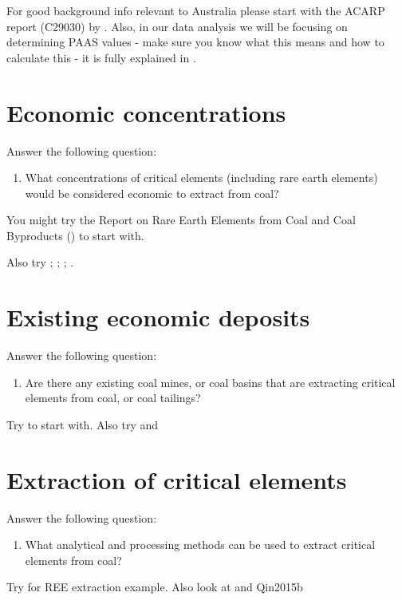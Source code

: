 \documentclass[preprint, 3p,
authoryear]{elsarticle} %
\providecommand{\tightlist}{%
  \setlength{\itemsep}{0pt}\setlength{\parskip}{0pt}}
\begin{document}
For good background info relevant to Australia please start with the
ACARP report (C29030) by \citet{Hodgkinson2021}. Also, in our data
analysis we will be focusing on determining PAAS values - make sure you
know what this means and how to calculate this - it is fully explained
in \citet{Hodgkinson2021}.

\hypertarget{economic-concentrations}{%
\section{Economic concentrations}\label{economic-concentrations}}

Answer the following question:

\begin{enumerate}
\def\labelenumi{\arabic{enumi}.}
\setcounter{enumi}{2}
\tightlist
\item
  What concentrations of critical elements (including rare earth
  elements) would be considered economic to extract from coal?
\end{enumerate}

You might try the Report on Rare Earth Elements from Coal and Coal
Byproducts (\citet{usde2017}) to start with.

Also try \citet{Seredin2012}; \citet{Dai2016}; \citet{Qin2015b};
\citet{SUN2014}.

\citet{Eterigho2021}

\hypertarget{existing-economic-deposits}{%
\section{Existing economic deposits}\label{existing-economic-deposits}}

Answer the following question:

\begin{enumerate}
\def\labelenumi{\arabic{enumi}.}
\setcounter{enumi}{3}
\tightlist
\item
  Are there any existing coal mines, or coal basins that are extracting
  critical elements from coal, or coal tailings?
\end{enumerate}

Try \citet{Qin2015b} to start with. Also try \citet{Sun2010} and
\citet{Qin2015}

\hypertarget{extraction-of-critical-elements}{%
\section{Extraction of critical
elements}\label{extraction-of-critical-elements}}

Answer the following question:

\begin{enumerate}
\def\labelenumi{\arabic{enumi}.}
\setcounter{enumi}{4}
\tightlist
\item
  What analytical and processing methods can be used to extract critical
  elements from coal?
\end{enumerate}

Try \citet{Eterigho2021} for REE extraction example. Also look at
\citet{Qin2015} and Qin2015b

\renewcommand\refname{References}

\end{document}
